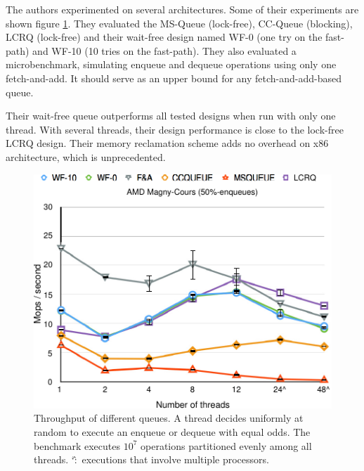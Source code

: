 


The authors experimented on several architectures. Some of their experiments are
shown figure \ref{fig:courbe}. They evaluated the MS-Queue (lock-free), CC-Queue
(blocking), LCRQ (lock-free) and their wait-free design named WF-0 (one try on
the fast-path) and WF-10 (10 tries on the fast-path). They also evaluated a
microbenchmark, simulating enqueue and dequeue operations using only one
fetch-and-add. It should serve as an upper bound for any fetch-and-add-based
queue.

Their wait-free queue outperforms all tested designs when run with only one
thread. With several threads, their design performance is close to the lock-free
LCRQ design. Their memory reclamation scheme adds no overhead on x86
architecture, which is unprecedented.

\begin{figure}
  \caption{ Throughput of different queues. A thread decides uniformly at random
    to execute an enqueue or dequeue with equal odds. The benchmark executes
    $10^7$ operations partitioned evenly among all threads. \char`\^:~executions
    that involve multiple processors. \cite{Yang:2016:WQF:3016078.2851168}}
    \label{fig:courbe}
    \center
    \includegraphics[width=1\linewidth]{img/courbe.pdf}
\end{figure}

